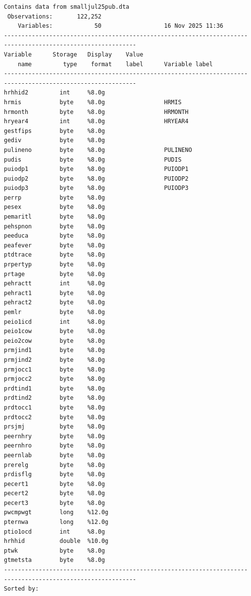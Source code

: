 \documentclass[
]{book}
\begin{document}
\begin{verbatim}
Contains data from smalljul25pub.dta
 Observations:       122,252                  
    Variables:            50                  16 Nov 2025 11:36
------------------------------------------------------------------------------------------------------------
Variable      Storage   Display    Value
    name         type    format    label      Variable label
------------------------------------------------------------------------------------------------------------
hrhhid2         int     %8.0g                 
hrmis           byte    %8.0g                 HRMIS
hrmonth         byte    %8.0g                 HRMONTH
hryear4         int     %8.0g                 HRYEAR4
gestfips        byte    %8.0g                 
gediv           byte    %8.0g                 
pulineno        byte    %8.0g                 PULINENO
pudis           byte    %8.0g                 PUDIS
puiodp1         byte    %8.0g                 PUIODP1
puiodp2         byte    %8.0g                 PUIODP2
puiodp3         byte    %8.0g                 PUIODP3
perrp           byte    %8.0g                 
pesex           byte    %8.0g                 
pemaritl        byte    %8.0g                 
pehspnon        byte    %8.0g                 
peeduca         byte    %8.0g                 
peafever        byte    %8.0g                 
ptdtrace        byte    %8.0g                 
prpertyp        byte    %8.0g                 
prtage          byte    %8.0g                 
pehractt        int     %8.0g                 
pehract1        byte    %8.0g                 
pehract2        byte    %8.0g                 
pemlr           byte    %8.0g                 
peio1icd        int     %8.0g                 
peio1cow        byte    %8.0g                 
peio2cow        byte    %8.0g                 
prmjind1        byte    %8.0g                 
prmjind2        byte    %8.0g                 
prmjocc1        byte    %8.0g                 
prmjocc2        byte    %8.0g                 
prdtind1        byte    %8.0g                 
prdtind2        byte    %8.0g                 
prdtocc1        byte    %8.0g                 
prdtocc2        byte    %8.0g                 
prsjmj          byte    %8.0g                 
peernhry        byte    %8.0g                 
peernhro        byte    %8.0g                 
peernlab        byte    %8.0g                 
prerelg         byte    %8.0g                 
prdisflg        byte    %8.0g                 
pecert1         byte    %8.0g                 
pecert2         byte    %8.0g                 
pecert3         byte    %8.0g                 
pwcmpwgt        long    %12.0g                
pternwa         long    %12.0g                
ptio1ocd        int     %8.0g                 
hrhhid          double  %10.0g                
ptwk            byte    %8.0g                 
gtmetsta        byte    %8.0g                 
------------------------------------------------------------------------------------------------------------
Sorted by: 
\end{verbatim}
\end{document}
